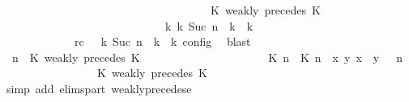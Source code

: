 \begin{isabellebody}
\ \ \ \ \ \ \ \ \ \ \ \ \ \ \ \ \ \ \ \ \ \ \ \ \ \ \ \ \ \ \ \ \ \ {\isasymturnstile}\ {\isasymPsi}\ {\isasymtriangleright}\ {\isacharparenleft}{\isacharparenleft}K\ weakly\ precedes\ K\ {\isacharhash}\ {\isasymPhi}{\isacharparenright}{\isacharparenright}\isanewline
\ \ \ \ \ \ \ \ \ \ \ \ \ \ \ \ \ \ \ \ \ \ \ \ \ \ \ \ \ {\isasymhookrightarrow}\isactrlbsup k\isactrlesup \ {\isacharparenleft}{\isasymGamma}\isactrlsub k{\isacharcomma}\ Suc\ n\ {\isasymturnstile}\ {\isasymPsi}\isactrlsub k\ {\isasymtriangleright}\ {\isasymPhi}\isactrlsub k{\isacharparenright}{\isacartoucheclose}\isanewline
\ \ \ \ \ \ \ \ \ \ \ \ \ rc{\isacharcolon}{\isacartoucheopen}{\isasymrho}\ {\isasymin}\ {\isasymlbrakk}\ {\isasymGamma}\isactrlsub k{\isacharcomma}\ Suc\ n\ {\isasymturnstile}\ {\isasymPsi}\isactrlsub k\ {\isasymtriangleright}\ {\isasymPhi}\isactrlsub k\ {\isasymrbrakk}\isactrlsub c\isactrlsub o\isactrlsub n\isactrlsub f\isactrlsub i\isactrlsub g{\isacartoucheclose}\ \isamarkupfalse%
\ blast\isanewline
\ \ \ \ \ \ \ \ \isamarkupfalse%
\ {\isacartoucheopen}{\isacharparenleft}{\isasymGamma}{\isacharcomma}\ n\ {\isasymturnstile}\ {\isacharparenleft}{\isacharparenleft}K\ weakly\ precedes\ K\ {\isacharhash}\ {\isasymPsi}{\isacharparenright}\ {\isasymtriangleright}\ {\isasymPhi}{\isacharparenright}\isanewline
\ \ \ \ \ \ \ \ \ \ \ \ \ \ \ \ {\isasymhookrightarrow}\ {\isacharparenleft}{\isacharparenleft}{\isacharparenleft}{\isasymlceil}{\isacharhash}\isactrlsup {\isasymle}\ K\ n{\isacharcomma}\ {\isacharhash}\isactrlsup {\isasymle}\ K\ n{\isasymrceil}\ {\isasymin}\ {\isacharparenleft}{\isasymlambda}{\isacharparenleft}x{\isacharcomma}\ y{\isacharparenright}{\isachardot}\ x\ {\isasymle}\ y{\isacharparenright}{\isacharparenright}\ {\isacharhash}\ {\isasymGamma}{\isacharparenright}{\isacharcomma}\ n\isanewline
\ \ \ \ \ \ \ \ \ \ \ \ \ \ {\isasymturnstile}\ {\isasymPsi}\ {\isasymtriangleright}\ {\isacharparenleft}{\isacharparenleft}K\ weakly\ precedes\ K\ {\isacharhash}\ {\isasymPhi}{\isacharparenright}{\isacharparenright}{\isacartoucheclose}\isanewline
\ \ \ \ \ \ \ \ \ \ \isamarkupfalse%
\ {\isacharparenleft}simp\ add{\isacharcolon}\ elims{\isacharunderscore}part\ weakly{\isacharunderscore}precedes{\isacharunderscore}e{\isacharparenright}\isanewline
\ \ \ \ \ \ \ \ \isamarkupfalse%

\end{isabellebody}
